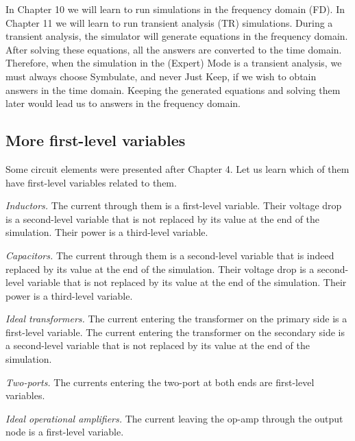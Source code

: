 In Chapter 10 we will learn to run simulations in the frequency
domain (FD). In Chapter 11 we will learn to run transient analysis
(TR) simulations. During a transient analysis, the simulator will
generate equations in the frequency domain. After solving these
equations, all the answers are converted to the time domain.
Therefore, when the simulation in the (Expert) Mode is a transient
analysis, we must always choose Symbulate, and never Just Keep, if
we wish to obtain answers in the time domain. Keeping the generated
equations and solving them later would lead us to answers in the
frequency domain.

\subsection{More first-level variables}

Some circuit elements were presented after Chapter 4. Let us learn
which of them have first-level variables related to them.

\emph{Inductors.} The current through them is a first-level
variable. Their voltage drop is a second-level variable that is not
replaced by its value at the end of the simulation. Their power is a
third-level variable.

\emph{Capacitors.} The current through them is a second-level
variable that is indeed replaced by its value at the end of the
simulation. Their voltage drop is a second-level variable that is
not replaced by its value at the end of the simulation. Their power
is a third-level variable.

\emph{Ideal transformers.} The current entering the transformer on
the primary side is a first-level variable. The current entering the
transformer on the secondary side is a second-level variable that is
not replaced by its value at the end of the simulation.

\emph{Two-ports.} The currents entering the two-port at both ends
are first-level variables.

\emph{Ideal operational amplifiers.} The current leaving the op-amp
through the output node is a first-level variable.
